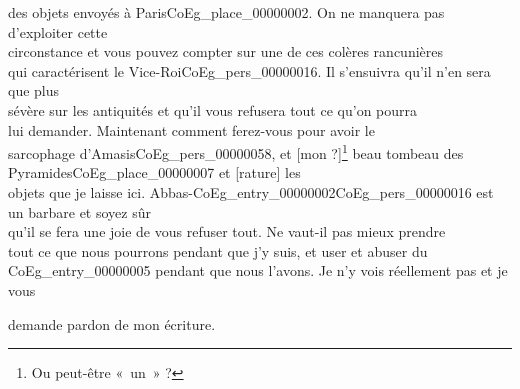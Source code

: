 \documentclass{book}
\begin{document}
des objets envoyés à Paris\gls{CoEg_place_00000002}. On ne manquera pas d’exploiter cette\\
circonstance et vous pouvez compter sur une de ces colères rancunières\\
qui caractérisent le Vice-Roi\gls{CoEg_pers_00000016}. Il s’ensuivra qu’il n’en sera que plus\\
sévère sur les antiquités et qu’il vous refusera tout ce qu’on pourra\\
lui demander. Maintenant comment ferez-vous pour avoir le\\
sarcophage d’Amasis\gls{CoEg_pers_00000058}, et {[mon ?]}\footnote{Ou peut-être «~un~» ?} beau tombeau des Pyramides\gls{CoEg_place_00000007} et [rature] les\\
objets que je laisse ici. Abbas-\Gls{CoEg_entry_00000002}\gls{CoEg_pers_00000016} est un barbare et soyez sûr\\
qu’il se fera une joie de vous refuser tout. Ne vaut-il pas mieux prendre\\
tout ce que nous pourrons pendant que j’y suis, et user et abuser du\\
\gls{CoEg_entry_00000005} pendant que nous l’avons. Je n’y vois réellement pas et je vous
\begin{flushright}demande pardon de mon écriture.\end{flushright}

\hypertarget{CoEg_Mariette_1853-08-28}{}
\end{document}
